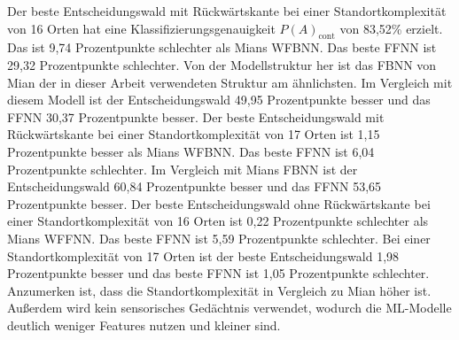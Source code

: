 Der beste Entscheidungswald mit Rückwärtskante bei einer Standortkomplexität von 16 Orten hat eine Klassifizierungsgenauigkeit $P(A)_{\text{cont}}$ von 83,52\% erzielt.
Das ist 9,74 Prozentpunkte schlechter als Mians WFBNN.
Das beste FFNN ist 29,32 Prozentpunkte schlechter.
Von der Modellstruktur her ist das FBNN von Mian der in dieser Arbeit verwendeten Struktur am ähnlichsten.
Im Vergleich mit diesem Modell ist der Entscheidungswald 49,95 Prozentpunkte besser und das FFNN 30,37 Prozentpunkte besser.
\newline
\newline
Der beste Entscheidungswald mit Rückwärtskante bei einer Standortkomplexität von 17 Orten ist 1,15 Prozentpunkte besser als Mians WFBNN.
Das beste FFNN ist 6,04 Prozentpunkte schlechter.
Im Vergleich mit Mians FBNN ist der Entscheidungswald 60,84 Prozentpunkte besser und das FFNN 53,65 Prozentpunkte besser.
\newline
\newline
Der beste Entscheidungswald ohne Rückwärtskante bei einer Standortkomplexität von 16 Orten ist 0,22 Prozentpunkte schlechter als Mians WFFNN.
Das beste FFNN ist 5,59 Prozentpunkte schlechter.
Bei einer Standortkomplexität von 17 Orten ist der beste Entscheidungswald 1,98 Prozentpunkte besser und das beste FFNN ist 1,05 Prozentpunkte schlechter.
Anzumerken ist, dass die Standortkomplexität in Vergleich zu Mian höher ist.
Außerdem wird kein sensorisches Gedächtnis verwendet, wodurch die ML-Modelle deutlich weniger Features nutzen und kleiner sind.

